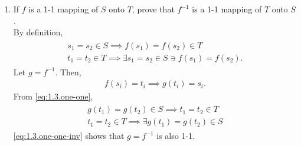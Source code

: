 \begin{enumerate}[label=\arabic*.,ref=\thesubsection.\theenumi]
\begin{enumerate}
\end{enumerate}
\item If $f$ is a 1-1 mapping of $S$ onto $T$, prove that $f^{- 1}$ is a 1-1 mapping of $T$ onto $S$.
	\\
		\solution  By definition,  
		\begin{align}
			\label{eq:1.3.one-one}
			\begin{split}
	s_1 = s_2 \in S	\implies	f(s_1) = f(s_2) \in T
	\\
			t_1 = t_2 \in T \implies \exists s_1 = s_2 \in S \ni f(s_1) = f(s_2).
			\end{split}
		\end{align}
Let $g = f^{-1}$. Then, 
		\begin{align}
			f(s_i) = t_i \implies g(t_i) = s_i.
		\end{align}
		From 
			\eqref{eq:1.3.one-one}, 
		\begin{align}
			\label{eq:1.3.one-one-inv}
			\begin{split}
				g(t_1) = g(t_2) \in S	\implies	 t_1= t_2 \in T
	\\
			t_1 = t_2 \in T \implies \exists g(t_1) = g(t_2) \in S 
			\end{split}
		\end{align}
			\eqref{eq:1.3.one-one-inv} shows that $g = f^{-1}$ is also 1-1.
		
\end{enumerate}
